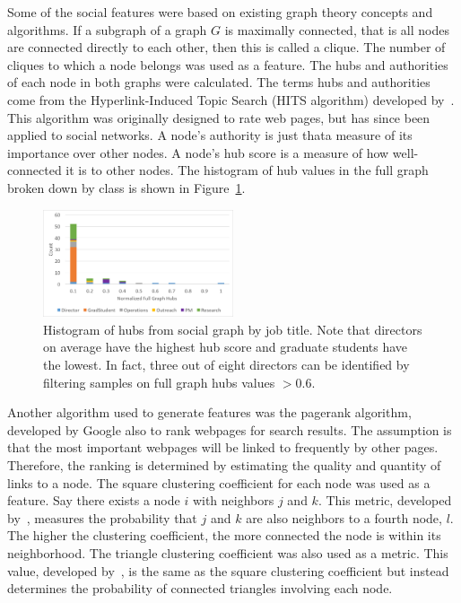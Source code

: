 \documentclass{article}
\begin{document}
Some of the social features were based on existing graph theory concepts and algorithms. If a subgraph of a graph $G$ is maximally connected, that is all nodes are connected directly to each other, then this is called a clique.  The number of cliques to which a node belongs was used as a feature.  The hubs and authorities of each node in both graphs were calculated.  The terms hubs and authorities come from the Hyperlink-Induced Topic Search (HITS algorithm) developed by~\cite{kleinberg_hubs_1999}.  This algorithm was originally designed to rate web pages, but has since been applied to social networks. A node's authority is just that\textemdash{}a measure of its importance over other nodes.  A node's hub score is a measure of how well-connected it is to other nodes.  The histogram of hub values in the full graph broken down by class is shown in Figure~\ref{fig:social_ex_hist}.  
\begin{figure}[H]
    \centering
        \includegraphics[width=0.5\textwidth]{Hubs_hist}
        \caption{Histogram of hubs from social graph by job title.  Note that directors on average have the highest hub score and graduate students have the lowest.  In fact, three out of eight directors can be identified by filtering samples on full graph hubs values $>0.6$. }
        \label{fig:social_ex_hist}
\end{figure}

Another algorithm used to generate features was the pagerank algorithm, developed by Google 
\cite{page_pagerank_1999} also to rank webpages for search results.  The assumption is that the most important webpages will be linked to frequently by other pages.  Therefore, the ranking is determined by estimating the quality and quantity of links to a node.  The square clustering coefficient for each node was used as a feature. Say there exists a node $i$ with neighbors $j$ and $k$. This metric, developed by~\cite{lind_cycles_2005}, measures the probability that $j$ and $k$ are also neighbors to a fourth node, $l$.  The higher the clustering coefficient, the more connected the node is within its neighborhood.  The triangle clustering coefficient was also used as a metric.  This value, developed by~\cite{saramaki_generalizations_2007}, is the same as the square clustering coefficient but instead determines the probability of connected triangles involving each node.
\end{document}
